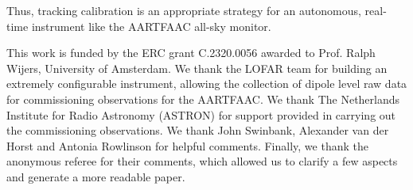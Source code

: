 \documentclass[referee]{aa}
\begin{document}
Thus,  tracking calibration  is an appropriate  strategy for  an autonomous,
real-time instrument like the \mbox{AARTFAAC} all-sky monitor.

\begin {acknowledgements}
This work is funded by the ERC grant C.2320.0056 awarded to Prof.  Ralph Wijers,
University  of Amsterdam.  We  thank the  LOFAR team  for building  an extremely
configurable instrument,  allowing the collection  of dipole level raw  data for
commissioning observations  for the  \mbox{AARTFAAC}.  We thank  The Netherlands
Institute for Radio Astronomy (ASTRON)  for support provided in carrying out the
commissioning observations. We thank John  Swinbank, Alexander van der Horst and
Antonia Rowlinson for helpful comments.  Finally, we thank the anonymous referee
for their  comments, which allowed  us to clarify  a few aspects and  generate a
more readable paper.
\end{acknowledgements}


\end{document}
